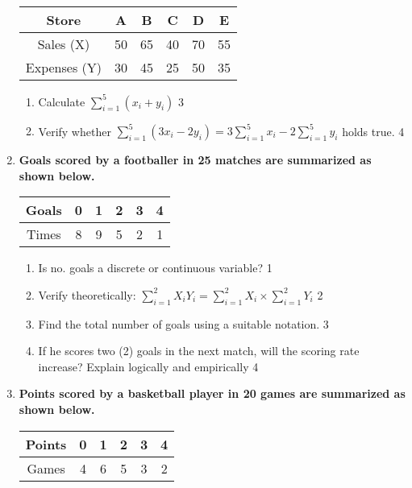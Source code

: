 \documentclass[a4paper,oneside]{book}
\begin{document}
\begin{enumerate}
\begin{table}[h]
\centering
\begin{tabular}{c|ccccc}
Store & A & B & C & D & E \\ \hline
Sales (X) & 50 & 65 & 40 & 70 & 55 \\ \hline
Expenses (Y) & 30 & 45 & 25 & 50 & 35
\end{tabular}
\end{table}

\begin{enumerate}
    \item 
    Calculate $\displaystyle \sum_{i=1}^5 (x_i + y_i)$ \hfill 3
    \item 
    Verify whether $\displaystyle \sum_{i=1}^5 (3x_i - 2y_i) = 3 \sum_{i=1}^5 x_i - 2 \sum_{i=1}^5 y_i$ holds true. \hfill 4
\end{enumerate}


\item
	  \textbf{Goals scored by a footballer in 25 matches are summarized as shown below.} 
	  
	  \begin{table}[h]
	  \centering
\begin{tabular}{|c|ccccc|}
Goals & 0 & 1 & 2 & 3 & 4 \\ \hline
Times & 8 & 9 & 5 & 2 & 1
\end{tabular}
\end{table}
  
  \begin{enumerate}
    \item
	Is no. goals a discrete or continuous variable? \hfill 1
    \item
	Verify theoretically: $\displaystyle \sum_{i=1}^{2} X_iY_i = \sum_{i=1}^{2} X_i \times \sum_{i=1}^{2} Y_i$ \hfill 2
    \item  
	Find the total number of goals using a suitable notation. \hfill 3
    \item
	If he scores two (2) goals in the next match, will the scoring rate increase? Explain logically and empirically \hfill 4
  \end{enumerate}
  
  \item
\textbf{Points scored by a basketball player in 20 games are summarized as shown below.}

\begin{table}[h]
\centering
\begin{tabular}{|c|ccccc|}
Points & 0 & 1 & 2 & 3 & 4 \\ \hline
Games  & 4 & 6 & 5 & 3 & 2
\end{tabular}
\end{table}


\end{enumerate}
\end{document}
